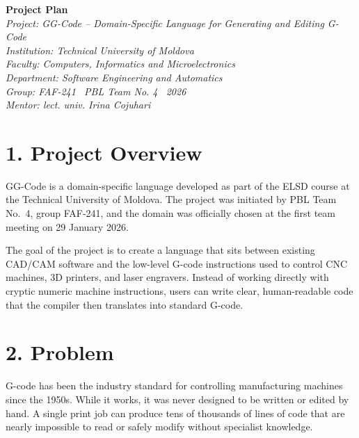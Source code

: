 \documentclass[12pt, a4paper]{article}
\begin{document}
\begin{center}
    {\Large\textbf{Project Plan}}\\[0.4em]
    \textit{Project: GG-Code -- Domain-Specific Language for Generating and Editing G-Code}\\[0.2em]
    \textit{Institution: Technical University of Moldova}\\[0.2em]
    \textit{Faculty: Computers, Informatics and Microelectronics}\\[0.2em]
    \textit{Department: Software Engineering and Automatics}\\[0.2em]
    \textit{Group: FAF-241 \textbar\ PBL Team No. 4 \textbar\ 2026}\\[0.2em]
    \textit{Mentor: lect. univ. Irina Cojuhari}
\end{center}

\vspace{1em}

\section{1. Project Overview}

GG-Code is a domain-specific language developed as part of the ELSD course at the Technical
University of Moldova. The project was initiated by PBL Team No.~4, group FAF-241, and the
domain was officially chosen at the first team meeting on 29 January 2026.

The goal of the project is to create a language that sits between existing CAD/CAM software
and the low-level G-code instructions used to control CNC machines, 3D printers, and laser
engravers. Instead of working directly with cryptic numeric machine instructions, users can
write clear, human-readable code that the compiler then translates into standard G-code.

\section{2. Problem}

G-code has been the industry standard for controlling manufacturing machines since the 1950s.
While it works, it was never designed to be written or edited by hand. A single print job can
produce tens of thousands of lines of code that are nearly impossible to read or safely modify
without specialist knowledge.
\end{document}
